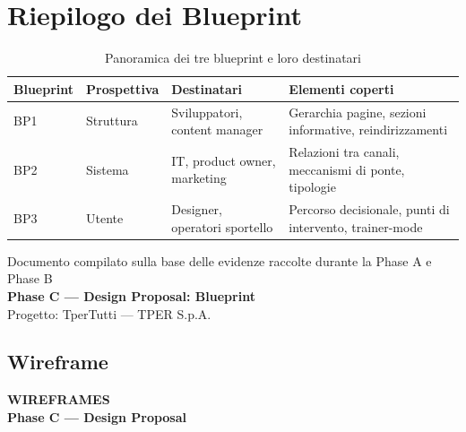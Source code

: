 ﻿\documentclass[11pt,a4paper]{article}
\begin{document}
\section{Riepilogo dei Blueprint}

\begin{table}[H]
\centering
\small
\renewcommand{\arraystretch}{1.3}
\begin{tabular}{|p{1.8cm}|p{3cm}|p{3.5cm}|p{5cm}|}
\hline
\textbf{Blueprint} & \textbf{Prospettiva} & \textbf{Destinatari} & \textbf{Elementi coperti} \\
\hline
BP1 & Struttura & Sviluppatori, content manager & Gerarchia pagine, sezioni informative, reindirizzamenti \\
\hline
BP2 & Sistema & IT, product owner, marketing & Relazioni tra canali, meccanismi di ponte, tipologie \\
\hline
BP3 & Utente & Designer, operatori sportello & Percorso decisionale, punti di intervento, trainer-mode \\
\hline
\end{tabular}
\caption{Panoramica dei tre blueprint e loro destinatari}
\label{tab:riepilogo-bp}
\end{table}

\vspace{0.5cm}

\begin{center}
{\color{secondaryColor}\small
Documento compilato sulla base delle evidenze raccolte durante la Phase A e Phase B \\[4pt]
\textbf{Phase C --- Design Proposal: Blueprint} \\[4pt]
Progetto: TperTutti --- TPER S.p.A.}
\end{center}

\vspace{0.3cm}


\newpage

\subsection{Wireframe}

\begin{tcolorbox}[headerbox]
 \color{white}\LARGE\bfseries\sffamily WIREFRAMES \\[0.1cm]
 \color{white!80}\small\sffamily Phase C --- Design Proposal
\end{tcolorbox}
\end{document}
